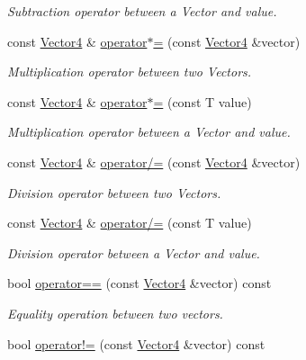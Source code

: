 \begin{DoxyCompactItemize}
\begin{DoxyCompactList}\small\item\em Subtraction operator between a Vector and value. \end{DoxyCompactList}\item 
const \hyperlink{classsparky_1_1_vector4}{Vector4} \& \hyperlink{classsparky_1_1_vector4_a06dc25a63c2250c55be0026facf1c253}{operator$\ast$=} (const \hyperlink{classsparky_1_1_vector4}{Vector4} \&vector)
\begin{DoxyCompactList}\small\item\em Multiplication operator between two Vectors. \end{DoxyCompactList}\item 
const \hyperlink{classsparky_1_1_vector4}{Vector4} \& \hyperlink{classsparky_1_1_vector4_ab5f46a5c4c0f18c29d24c1f0a0326588}{operator$\ast$=} (const T value)
\begin{DoxyCompactList}\small\item\em Multiplication operator between a Vector and value. \end{DoxyCompactList}\item 
const \hyperlink{classsparky_1_1_vector4}{Vector4} \& \hyperlink{classsparky_1_1_vector4_aba1d5417013e311c920582cb45e3d32e}{operator/=} (const \hyperlink{classsparky_1_1_vector4}{Vector4} \&vector)
\begin{DoxyCompactList}\small\item\em Division operator between two Vectors. \end{DoxyCompactList}\item 
const \hyperlink{classsparky_1_1_vector4}{Vector4} \& \hyperlink{classsparky_1_1_vector4_a6e667e9216b5dfe475d39d909d537fb5}{operator/=} (const T value)
\begin{DoxyCompactList}\small\item\em Division operator between a Vector and value. \end{DoxyCompactList}\item 
bool \hyperlink{classsparky_1_1_vector4_a34001cee69e9ac1f8bde1a25762a2dec}{operator==} (const \hyperlink{classsparky_1_1_vector4}{Vector4} \&vector) const 
\begin{DoxyCompactList}\small\item\em Equality operation between two vectors. \end{DoxyCompactList}\item 
bool \hyperlink{classsparky_1_1_vector4_aff8ded67031d66bd41887329a3c6101d}{operator!=} (const \hyperlink{classsparky_1_1_vector4}{Vector4} \&vector) const 

\end{DoxyCompactItemize}
